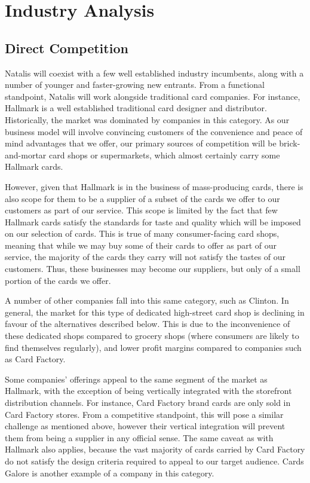 \documentclass[10pt, a4paper]{article}
\begin{document}
\section*{Industry Analysis}
\subsection*{Direct Competition}


Natalis will coexist with a few well established industry incumbents, along with a number of younger and faster-growing new entrants. From a functional standpoint, Natalis will work alongside traditional card companies. For instance, Hallmark is a well established traditional card designer and distributor. Historically, the market was dominated by companies in this category. As our business model will involve convincing customers of the convenience and peace of mind advantages that we offer, our primary sources of competition will be brick-and-mortar card shops or supermarkets, which almost certainly carry some Hallmark cards.

However, given that Hallmark is in the business of mass-producing cards, there is also scope for them to be a supplier of a subset of the cards we offer to our customers as part of our service. This scope is limited by the fact that few Hallmark cards satisfy the standards for taste and quality which will be imposed on our selection of cards. This is true of many consumer-facing card shops, meaning that while we may buy some of their cards to offer as part of our service, the majority of the cards they carry will not satisfy the tastes of our customers. Thus, these businesses may become our suppliers, but only of a small portion of the cards we offer.

A number of other companies fall into this same category, such as Clinton. In general, the market for this type of dedicated high-street card shop is declining in favour of the alternatives described below. This is due to the inconvenience of these dedicated shops compared to grocery shops (where consumers are likely to find themselves regularly), and lower profit margins compared to companies such as Card Factory.

Some companies' offerings appeal to the same segment of the market as Hallmark, with the exception of being vertically integrated with the storefront distribution channels. For instance, Card Factory brand cards are only sold in Card Factory stores. From a competitive standpoint, this will pose a similar challenge as mentioned above, however their vertical integration will prevent them from being a supplier in any official sense. The same caveat as with Hallmark also applies, because the vast majority of cards carried by Card Factory do not satisfy the design criteria required to appeal to our target audience. Cards Galore is another example of a company in this category.
\end{document}
